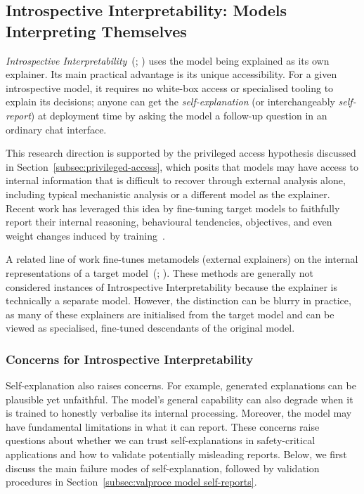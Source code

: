 \subsection{Introspective Interpretability: Models Interpreting Themselves}
\label{sec:intro-interpretability}
\emph{Introspective Interpretability}~(; ) uses the model being explained as its own explainer. Its main practical advantage is its unique accessibility. For a given introspective model, it requires no white-box access or specialised tooling to explain its decisions; anyone can get the \emph{self-explanation} (or interchangeably \emph{self-report}) at deployment time by asking the model a follow-up question in an ordinary chat interface.

This research direction is supported by the privileged access hypothesis discussed in Section~\ref{subsec:privileged-access}, which posits that models may have access to internal information that is difficult to recover through external analysis alone, including typical mechanistic analysis or a different model as the explainer. Recent work has leveraged this idea by fine-tuning target models to faithfully report their internal reasoning, behavioural tendencies, objectives, and even weight changes induced by training~.

A related line of work fine-tunes metamodels (external explainers) on the internal representations of a target model~(; ). These methods are generally not considered instances of Introspective Interpretability because the explainer is technically a separate model. However, the distinction can be blurry in practice, as many of these explainers are initialised from the target model and can be viewed as specialised, fine-tuned descendants of the original model.

\subsubsection{Concerns for Introspective Interpretability}

Self-explanation also raises concerns. For example, generated explanations can be plausible yet unfaithful. The model’s general capability can also degrade when it is trained to honestly verbalise its internal processing. Moreover, the model may have fundamental limitations in what it can report. These concerns raise questions about whether we can trust self-explanations in safety-critical applications and how to validate potentially misleading reports. Below, we first discuss the main failure modes of self-explanation, followed by validation procedures in Section~\ref{subsec:valproce model self-reports}. 

